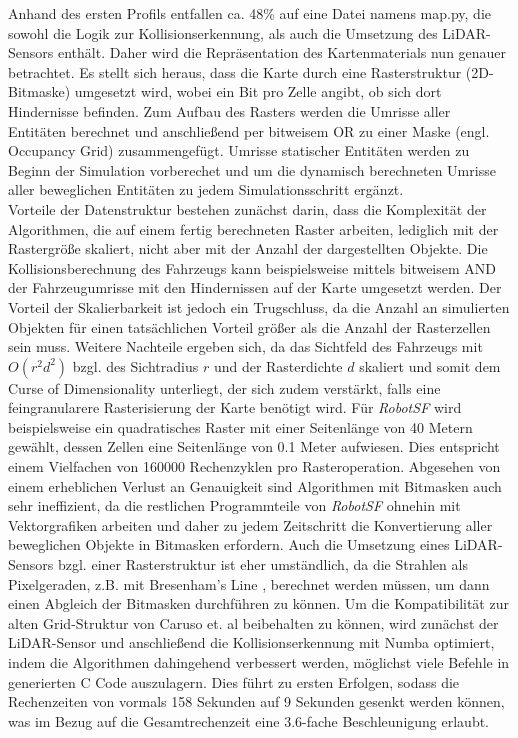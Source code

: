Anhand des ersten Profils entfallen ca. 48\% auf eine Datei namens \glqq{}map.py\grqq{},
die sowohl die Logik zur Kollisionserkennung, als auch die Umsetzung des LiDAR-Sensors
enthält. Daher wird die Repräsentation des Kartenmaterials nun genauer betrachtet. Es stellt
sich heraus, dass die Karte durch eine Rasterstruktur (2D-Bitmaske) umgesetzt wird, wobei
ein Bit pro Zelle angibt, ob sich dort Hindernisse befinden. Zum Aufbau des Rasters werden
die Umrisse aller Entitäten berechnet und anschließend per bitweisem OR zu einer Maske
(engl. Occupancy Grid) zusammengefügt. Umrisse statischer Entitäten werden zu Beginn der
Simulation vorberechet und um die dynamisch berechneten Umrisse aller beweglichen
Entitäten zu jedem Simulationsschritt ergänzt.\\

Vorteile der Datenstruktur bestehen zunächst darin, dass die Komplexität der Algorithmen,
die auf einem fertig berechneten Raster arbeiten, lediglich mit der Rastergröße skaliert,
nicht aber mit der Anzahl der dargestellten Objekte. Die Kollisionsberechnung des
Fahrzeugs kann beispielsweise mittels bitweisem AND der Fahrzeugumrisse mit den
Hindernissen auf der Karte umgesetzt werden. Der Vorteil der Skalierbarkeit ist jedoch
ein Trugschluss, da die Anzahl an simulierten Objekten für einen tatsächlichen Vorteil
größer als die Anzahl der Rasterzellen sein muss. Weitere Nachteile ergeben sich, da das
Sichtfeld des Fahrzeugs mit $O(r^2 d^2)$ bzgl. des Sichtradius $r$ und der Rasterdichte
$d$ skaliert und somit dem \glqq{}Curse of Dimensionality\grqq{} unterliegt, der sich
zudem verstärkt, falls eine feingranularere Rasterisierung der Karte benötigt wird.
Für \emph{RobotSF} wird beispielsweise ein quadratisches Raster mit einer Seitenlänge
von 40 Metern gewählt, dessen Zellen eine Seitenlänge von 0.1 Meter aufwiesen.
Dies entspricht einem Vielfachen von 160000 Rechenzyklen pro Rasteroperation.
Abgesehen von einem erheblichen Verlust an Genauigkeit sind Algorithmen mit Bitmasken
auch sehr ineffizient, da die restlichen Programmteile von \emph{RobotSF} ohnehin mit
Vektorgrafiken arbeiten und daher zu jedem Zeitschritt die Konvertierung aller beweglichen
Objekte in Bitmasken erfordern.
Auch die Umsetzung eines LiDAR-Sensors bzgl. einer Rasterstruktur ist eher umständlich,
da die Strahlen als Pixelgeraden, z.B. mit Bresenham's Line \cite{bresenham65linealgo},
berechnet werden müssen, um dann einen Abgleich der Bitmasken durchführen zu können.
Um die Kompatibilität zur alten Grid-Struktur von Caruso et. al beibehalten zu können, wird
zunächst der LiDAR-Sensor und anschließend die Kollisionserkennung mit Numba optimiert,
indem die Algorithmen dahingehend verbessert werden, möglichst viele Befehle in generierten
C Code auszulagern. Dies führt zu ersten Erfolgen, sodass die Rechenzeiten von vormals 158
Sekunden auf 9 Sekunden gesenkt werden können, was im Bezug auf die Gesamtrechenzeit eine
3.6-fache Beschleunigung erlaubt.\\

